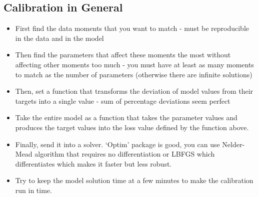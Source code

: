 \documentclass[12pt]{article}
\begin{document}
\subsection*{Calibration in General}
\begin{itemize}\setlength\itemsep{0em} \small
    \item First find the data moments that you want to match - must be reproducible in the data and in the model
    \item Then find the parameters that affect these moments the most without affecting other moments too much - you must have at least as many moments to match as the number of parameters (otherwise there are infinite solutions)
    \item Then, set a function that transforms the deviation of model values from their targets into a single value - sum of percentage deviations seem perfect
    \item Take the entire model as a function that takes the parameter values and produces the target values into the loss value defined by the function above. 
    \item Finally, send it into a solver. `Optim' package is good, you can use Nelder-Mead algorithm that requires no differentiation or LBFGS which differentiates which makes it faster but less robust.
    \item Try to keep the model solution time at a few minutes to make the calibration run in time. 
\end{itemize} \normalsize


\newpage
\end{document}
